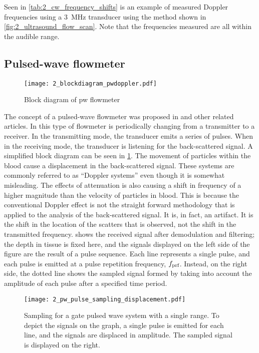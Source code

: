 Seen in \cref{tab:2_cw_frequency_shifts} is an example of measured Doppler frequencies using a \qty{3}{\mega\hertz} transducer using the method shown in \cref{fig:2_ultrasound_flow_scan}. Note that the frequencies measured are all within the audible range.

\subsection{Pulsed-wave flowmeter}
\begin{figure}[ht]
	\centering
	\texttt{[image: 2\_blockdiagram\_pwdoppler.pdf]}
	\caption[Block diagram of pulsed-wave flowmeter]{Block diagram of \gls{pw} flowmeter \cite{JensenUltrasoundBook}}
	\label{fig:2_devices_pw}
\end{figure}
The concept of a pulsed-wave flowmeter was proposed in \cite{Baker1970} and other related articles. In this type of flowmeter is periodically changing from a transmitter to a receiver. In the transmitting mode, the transducer emits a series of pulses. When in the receiving mode, the transducer is listening for the back-scattered signal. A simplified block diagram can be seen in \cref{fig:2_devices_pw}. The movement of particles within the blood cause a displacement in the back-scattered signal. These systems are commonly referred to as \enquote{Doppler systems} even though it is somewhat misleading. The effects of attenuation is also causing a shift in frequency of a higher magnitude than the velocity of particles in blood. This is because the conventional Doppler effect is not the straight forward methodology that is applied to the analysis of the back-scattered signal. It is, in fact, an artifact. It is the shift in the location of the scatters that is observed, not the shift in the transmitted frequency.  shows the received signal after demodulation and filtering; the depth in tissue is fixed here, and the signals displayed on the left side of the figure are the result of a pulse sequence. Each line represents a single pulse, and each pulse is emitted at a pulse repetition frequency, $f_{\textup{prf}}$. Instead, on the right side, the dotted line shows the sampled signal formed by taking into account the amplitude of each pulse after a specified time period.

\begin{figure}[ht]
	\centering
	\texttt{[image: 2\_pw\_pulse\_sampling\_displacement.pdf]}
	\caption[Sampling for a gate pulsed wave system with a single range]{Sampling for a gate pulsed wave system with a single range. To depict the signals on the graph, a single pulse is emitted for each line, and the signals are displaced in amplitude. The sampled signal is displayed on the right. \cite{JensenUltrasoundBook}}
	\label{fig:2_pw_sampling_displacement}
\end{figure}


